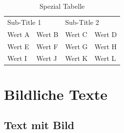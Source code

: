 \documentclass{scrreprt}
\begin{document}
		\begin{table}[h!]

		\centering
		\caption{Spezial Tabelle}
		\label{tab:speziatabelle}

	
		\begin{tabular}{|l|l|l|l|}

		\multicolumn{2}{|l|}{Sub-Title 1} & \multicolumn{2}{l|}{Sub-Title 2} \\ 
		Wert A          & Wert B          & Wert C          & Wert D         \\ 
		Wert E          & Wert F          & Wert G          & Wert H         \\ 
		Wert I          & Wert J          & Wert K          & Wert L         \\ 
		\end{tabular}
		\end{table}
		\newpage

	\chapter{Bildliche Texte}
	\label{cha:bildlichetexte}
		\section{Text mit Bild \cite{ref2}}
	\label{se:textmitbild}
	
\end{document}
